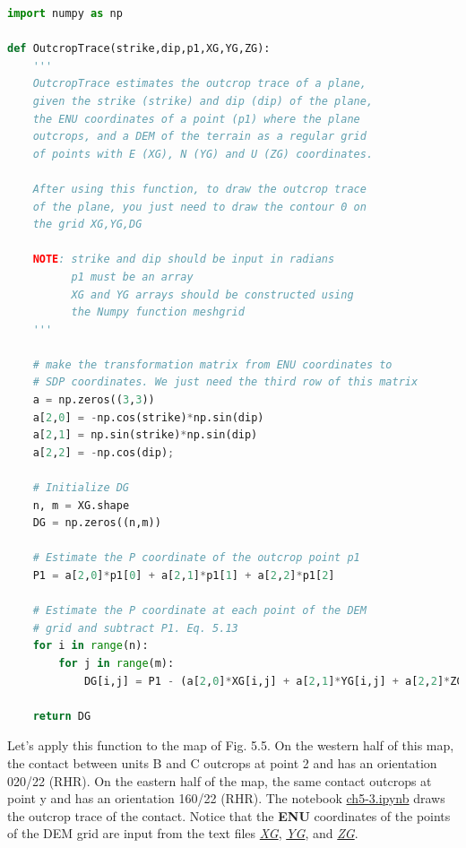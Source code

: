 \documentclass[a4paper , 12pt]{book}
\begin{document}
\begin{lstlisting}[language=Python, frame=single]
import numpy as np

def OutcropTrace(strike,dip,p1,XG,YG,ZG):
    '''
    OutcropTrace estimates the outcrop trace of a plane,
    given the strike (strike) and dip (dip) of the plane,
    the ENU coordinates of a point (p1) where the plane
    outcrops, and a DEM of the terrain as a regular grid
    of points with E (XG), N (YG) and U (ZG) coordinates.
    
    After using this function, to draw the outcrop trace 
    of the plane, you just need to draw the contour 0 on 
    the grid XG,YG,DG
    
    NOTE: strike and dip should be input in radians
          p1 must be an array
          XG and YG arrays should be constructed using 
          the Numpy function meshgrid
    '''
    
    # make the transformation matrix from ENU coordinates to 
    # SDP coordinates. We just need the third row of this matrix
    a = np.zeros((3,3))
    a[2,0] = -np.cos(strike)*np.sin(dip) 
    a[2,1] = np.sin(strike)*np.sin(dip) 
    a[2,2] = -np.cos(dip);
    
    # Initialize DG
    n, m = XG.shape
    DG = np.zeros((n,m))
    
    # Estimate the P coordinate of the outcrop point p1
    P1 = a[2,0]*p1[0] + a[2,1]*p1[1] + a[2,2]*p1[2]
    
    # Estimate the P coordinate at each point of the DEM
    # grid and subtract P1. Eq. 5.13
    for i in range(n):
        for j in range(m):
            DG[i,j] = P1 - (a[2,0]*XG[i,j] + a[2,1]*YG[i,j] + a[2,2]*ZG[i,j])
    
    return DG  
\end{lstlisting}

Let's apply this function to the map of Fig. 5.5. On the western half of this map, the contact between units B and C outcrops at point 2 and has an orientation 020/22 (RHR). On the eastern half of the map, the same contact outcrops at point y and has an orientation 160/22 (RHR). The notebook \href{https://github.com/nfcd/compGeo/blob/master/source/notebooks/ch5-3.ipynb}{ch5-3.ipynb} draws the outcrop trace of the contact. Notice that the \textbf{ENU} coordinates of the points of the DEM grid are input from the text files \href{https://github.com/nfcd/compGeo/blob/master/source/data/ch5-3/XG.txt}{\textit{XG}}, \href{https://github.com/nfcd/compGeo/blob/master/source/data/ch5-3/YG.txt}{\textit{YG}}, and \href{https://github.com/nfcd/compGeo/blob/master/source/data/ch5-3/ZG.txt}{\textit{ZG}}.
\end{document}
